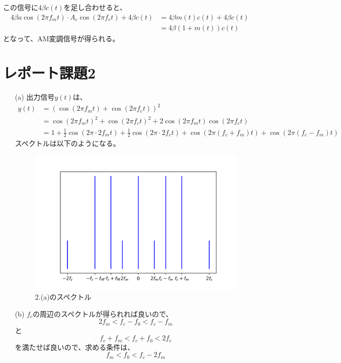 \documentclass[dvipdfmx]{jsarticle}
\begin{document}
\begin{enumerate}
この信号に$4\beta c(t)$を足し合わせると、
\begin{align*}
4\beta a\cos{(2\pi f_{m}t)}\cdot A_{c}\cos{(2\pi f_{c}t)} + 4\beta c(t) &= 4\beta m(t)c(t) + 4\beta c(t) \\
&= 4\beta\left(1+m(t)\right)c(t)
\end{align*}
となって、AM変調信号が得られる。
\end{enumerate}
\section*{レポート課題2}
\begin{enumerate}
\item[(a)]
出力信号$y(t)$は、
\begin{align*}
y(t) &= \left(\cos{(2\pi f_{m}t)} + \cos{(2\pi f_{c}t)}\right)^{2} \\
&= \cos{(2\pi f_{m}t)}^{2} + \cos{(2\pi f_{c}t)}^{2} + 2\cos{(2\pi f_{m}t)} \cos{(2\pi f_{c}t)}\\
&= 1+\frac{1}{2} \cos{(2\pi \cdot2f_{m}t)} + \frac{1}{2}\cos{(2\pi \cdot 2f_{c}t)} + \cos{(2\pi (f_{c}+f_{m})t)} + \cos{(2\pi (f_{c} -f_{m})t)}
\end{align*}
スペクトルは以下のようになる。

\begin{center}
\begin{figure}[H]
\includegraphics[scale = 0.8]{3_2.png}
\caption{2.(a)のスペクトル}
\end{figure}
\end{center}

\item[(b)]
$f_{c}$の周辺のスペクトルが得られれば良いので、
\[ 2f_{m} < f_{c} - f_{0} < f_{c} - f_{m}\]
と
\[f_{c}+f_{m} < f_{c} + f_{0} < 2f_{c}\]
を満たせば良いので、求める条件は、
\[f_{m} < f_{0} < f_{c} - 2f_{m}\]



\end{enumerate}
\end{document}
